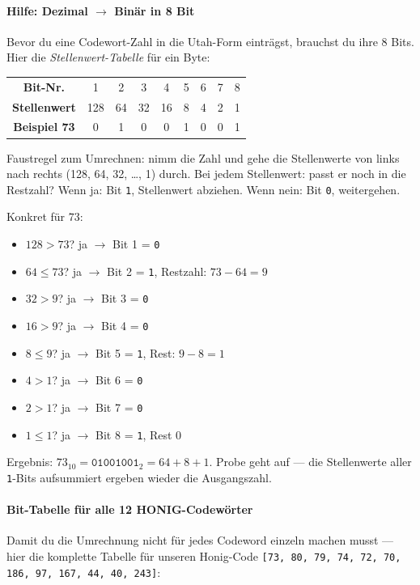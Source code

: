 \paragraph{Hilfe: Dezimal $\to$ Binär in 8 Bit}
Bevor du eine Codewort-Zahl in die Utah-Form einträgst, brauchst du
ihre 8 Bits. Hier die \emph{Stellenwert-Tabelle} für ein Byte:

\begin{center}
\small
\begin{tabular}{c | c c c c c c c c}
\toprule
\textbf{Bit-Nr.} & 1 & 2 & 3 & 4 & 5 & 6 & 7 & 8 \\
\textbf{Stellenwert} & 128 & 64 & 32 & 16 & 8 & 4 & 2 & 1 \\
\midrule
\textbf{Beispiel 73} & 0 & 1 & 0 & 0 & 1 & 0 & 0 & 1 \\
\bottomrule
\end{tabular}
\end{center}

Faustregel zum Umrechnen: nimm die Zahl und gehe die Stellenwerte
von links nach rechts (128, 64, 32, \dots, 1) durch. Bei jedem
Stellenwert: passt er noch in die Restzahl? Wenn ja: Bit \texttt{1},
Stellenwert abziehen. Wenn nein: Bit \texttt{0}, weitergehen.

Konkret für $73$:

\begin{itemize}
\item $128 > 73$? ja $\to$ Bit 1 = \texttt{0}
\item $64 \le 73$? ja $\to$ Bit 2 = \texttt{1}, Restzahl: $73 - 64 = 9$
\item $32 > 9$? ja $\to$ Bit 3 = \texttt{0}
\item $16 > 9$? ja $\to$ Bit 4 = \texttt{0}
\item $8 \le 9$? ja $\to$ Bit 5 = \texttt{1}, Rest: $9 - 8 = 1$
\item $4 > 1$? ja $\to$ Bit 6 = \texttt{0}
\item $2 > 1$? ja $\to$ Bit 7 = \texttt{0}
\item $1 \le 1$? ja $\to$ Bit 8 = \texttt{1}, Rest $0$ \checkmark
\end{itemize}

Ergebnis: $73_{10} = \texttt{01001001}_2 = 64 + 8 + 1$. Probe geht
auf — die Stellenwerte aller \texttt{1}-Bits aufsummiert ergeben
wieder die Ausgangszahl.

\paragraph{Bit-Tabelle für alle 12 HONIG-Codewörter}
Damit du die Umrechnung nicht für jedes Codeword einzeln machen
musst — hier die komplette Tabelle für unseren Honig-Code
\texttt{[73, 80, 79, 74, 72, 70, 186, 97, 167, 44, 40, 243]}:


